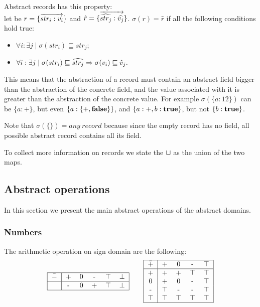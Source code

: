 Abstract records has this property: \\
let be $r = \{\overrightarrow{str_i: v_i}\}$ and $\hat{r}=\{\overrightarrow{\widehat{str_j}: \widehat{v_j}}\}$. $\sigma(r) = \hat{r}$ if all the following conditions hold true: 
\begin{itemize}
\item $\forall i: \exists j \mid \sigma(str_i) \sqsubseteq str_j$;
\item $\forall i: \exists j \mid \sigma(str_i) \sqsubseteq \widehat{str_j} \Rightarrow \sigma(v_i) \sqsubseteq \hat{v}_j.$
\end{itemize}

This means that the abstraction of a record must contain an abstract field bigger than the abstraction of the concrete field, and the value associated with it is greater than the abstraction of the concrete value. For example $\sigma(\{a: 12\})$ can be $\{a: +\}$, but even $\{a: \{+, \mathbf{false}\}\}$, and $\{a: +, b: \mathbf{true}\}$, but not $\{b: \mathbf{true}\}$. 

Note that $\sigma(\{\}) = any\ record$ because since the empty record has no field, all possible abstract record contains all its field.

To collect more information on records we state the $\sqcup$ as the union of the two maps.

\subsection{Abstract operations} %
\label{sec:AbstractOp}
In this section we present the main abstract operations of the abstract domains.

\subsubsection{Numbers}
The arithmetic operation on sign domain are the following:
\begin{align*}
\begin{tabular}{ | c | *{5}{c}|}
  \hline                       
  $\bar{-}$ & + & 0 & - & $\top$ & $\bot$ \\
  \hline
   & - & 0 & + & $\top$ & $\bot$ \\
  \hline  
\end{tabular}
\qquad 
\begin{tabular}{ | c | *{4}{c}|}
  \hline                       
  $\bar{+}$ & + & 0 & - & $\top$ \\
  \hline
   + & + & + & $\top$ & $\top$\\
   0 & + & 0 & - & $\top$\\
   - & $\top$ & - & - & $\top$\\
   $\top$ & $\top$ & $\top$ & $\top$ & $\top$\\
  \hline  
\end{tabular}
\end{align*}

